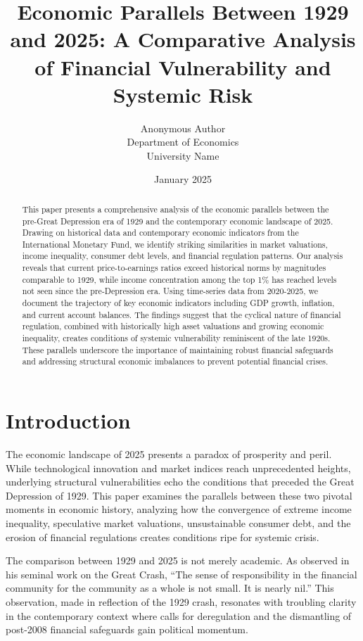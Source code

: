 \documentclass[12pt,letterpaper]{article}
\title{Economic Parallels Between 1929 and 2025: A Comparative Analysis of Financial Vulnerability and Systemic Risk}
\author{Anonymous Author\\Department of Economics\\University Name}
\date{January 2025}
\begin{document}
\maketitle

\begin{abstract}
This paper presents a comprehensive analysis of the economic parallels between the pre-Great Depression era of 1929 and the contemporary economic landscape of 2025. Drawing on historical data and contemporary economic indicators from the International Monetary Fund, we identify striking similarities in market valuations, income inequality, consumer debt levels, and financial regulation patterns. Our analysis reveals that current price-to-earnings ratios exceed historical norms by magnitudes comparable to 1929, while income concentration among the top 1\% has reached levels not seen since the pre-Depression era. Using time-series data from 2020-2025, we document the trajectory of key economic indicators including GDP growth, inflation, and current account balances. The findings suggest that the cyclical nature of financial regulation, combined with historically high asset valuations and growing economic inequality, creates conditions of systemic vulnerability reminiscent of the late 1920s. These parallels underscore the importance of maintaining robust financial safeguards and addressing structural economic imbalances to prevent potential financial crises.
\end{abstract}

\section{Introduction}

The economic landscape of 2025 presents a paradox of prosperity and peril. While technological innovation and market indices reach unprecedented heights, underlying structural vulnerabilities echo the conditions that preceded the Great Depression of 1929. This paper examines the parallels between these two pivotal moments in economic history, analyzing how the convergence of extreme income inequality, speculative market valuations, unsustainable consumer debt, and the erosion of financial regulations creates conditions ripe for systemic crisis.

The comparison between 1929 and 2025 is not merely academic. As \cite{galbraith1954} observed in his seminal work on the Great Crash, ``The sense of responsibility in the financial community for the community as a whole is not small. It is nearly nil.'' This observation, made in reflection of the 1929 crash, resonates with troubling clarity in the contemporary context where calls for deregulation and the dismantling of post-2008 financial safeguards gain political momentum.
\end{document}
